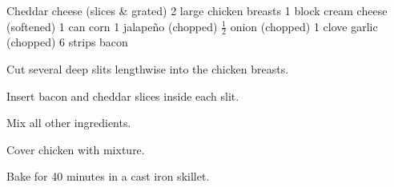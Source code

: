 \dishtype{}
\begin{ingreds}
    Cheddar cheese (slices \& grated)
    2 large chicken breasts
    1 block cream cheese (softened)
    1 can corn
    1 jalape\~no (chopped)
    $\frac{1}{2}$ onion (chopped)
    1 clove garlic (chopped)
    6 strips bacon
\end{ingreds}
\begin{method}
    Cut several deep slits lengthwise into the chicken breasts.\par
    Insert bacon and cheddar slices inside each slit.\par
    Mix all other ingredients.\par
    Cover chicken with mixture.\par
    Bake for 40 minutes in a cast iron skillet.
\end{method}